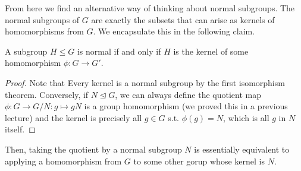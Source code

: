 From here we find an alternative way of thinking about normal subgroups. The normal
subgroups of $G$ are exactly the subsets that can arise as kernels of homomorphisms from
$G$. We encapsulate this in the following claim.

\begin{proposition}
  A subgroup $H\leq G$ is normal if and only if $H$ is the kernel of some homomorphism
  $\phi: G\to G'$.
\end{proposition}
\begin{proof}
  Note that Every kernel is a normal subgroup by the first isomorphism theorem.
  Conversely, if $N\trianglelefteq G$, we can always define the quotient map $\phi:G\to
  G/N : g\mapsto gN$ is a group homomorphism (we proved this in a previous lecture) and
  the kernel is precisely all $g\in G$ s.t. $\phi(g)=N$, which is all $g$ in $N$ itself.
\end{proof}

Then, taking the quotient by a normal subgroup $N$ is essentially equivalent to applying a
homomorphism from $G$ to some other gorup whose kernel is $N$.
